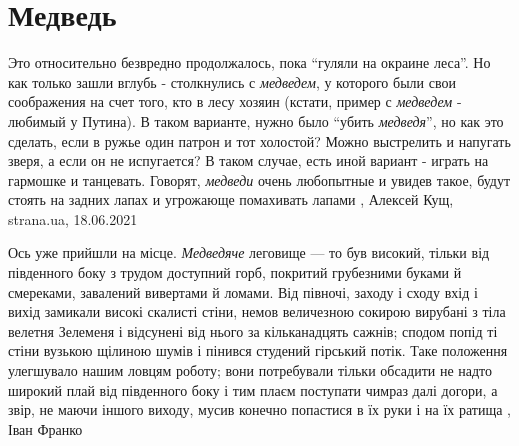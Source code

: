  
 
 
 
 
\chapter{Медведь}
\label{sec:slova.medvedj}

Это относительно безвредно продолжалось, пока \enquote{гуляли на окраине леса}.
Но как только зашли вглубь - столкнулись с \emph{медведем}, у которого были
свои соображения на счет того, кто в лесу хозяин (кстати, пример с
\emph{медведем} - любимый у Путина).  В таком варианте, нужно было
\enquote{убить \emph{медведя}}, но как это сделать, если в ружье один патрон и
тот холостой?  Можно выстрелить и напугать зверя, а если он не испугается? В
таком случае, есть иной вариант - играть на гармошке и танцевать.  Говорят,
\emph{медведи} очень любопытные и увидев такое, будут стоять на задних лапах и
угрожающе помахивать лапами
, 
Алексей Кущ, strana.ua, 18.06.2021

Ось уже прийшли на місце. \emph{Медведяче} леговище — то був високий, тільки від
південного боку з трудом доступний горб, покритий грубезними буками й
смереками, завалений вивертами й ломами. Від півночі, заходу і сходу вхід і
вихід замикали високі скалисті стіни, немов величезною сокирою вирубані з тіла
велетня Зелеменя і відсунені від нього за кільканадцять сажнів; сподом попід ті
стіни вузькою щілиною шумів і пінився студений гірський потік. Таке положення
улегшувало нашим ловцям роботу; вони потребували тільки обсадити не надто
широкий плай від південного боку і тим плаєм поступати чимраз далі догори, а
звір, не маючи іншого виходу, мусив конечно попастися в їх руки і на їх ратища
, Іван Франко
